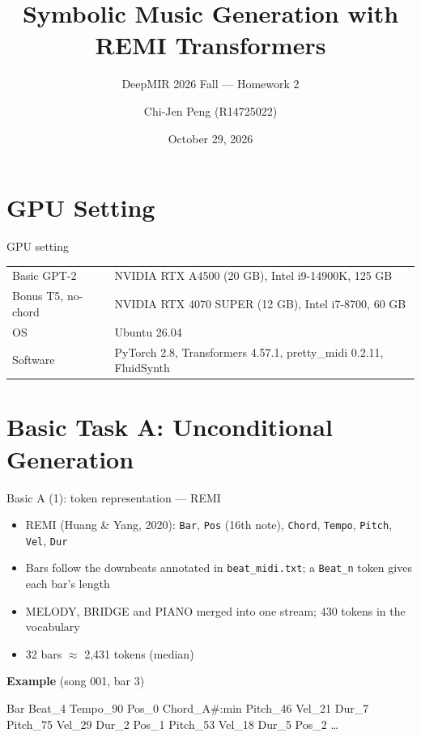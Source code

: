 \documentclass[aspectratio=169,11pt]{beamer}
\title{Symbolic Music Generation with REMI Transformers}
\subtitle{DeepMIR 2026 Fall --- Homework 2}
\author{Chi-Jen Peng \quad (R14725022)}
\institute{Code, README: \url{https://github.com/chijenpeng/26-fall-DeepMIR-HW2}\\[0.3em]
Checkpoints, generated results: \url{https://github.com/chijenpeng/26-fall-DeepMIR-HW2/releases/tag/submission-v1}}
\date{October 29, 2026}
\newenvironment{tight}{\begin{itemize}\setlength{\itemsep}{1.5pt}\setlength{\parskip}{0pt}\setlength{\topsep}{0pt}}{\end{itemize}}
\begin{document}
\maketitle

\section{GPU Setting}
\begin{frame}{GPU setting}
  \centering
  \begin{tabular}{@{}ll@{}}
    \toprule
    Basic GPT-2 & NVIDIA RTX A4500 (20 GB), Intel i9-14900K, 125 GB \\
    Bonus T5, no-chord & NVIDIA RTX 4070 SUPER (12 GB), Intel i7-8700, 60 GB \\
    OS & Ubuntu 26.04 \\
    Software & PyTorch 2.8, Transformers 4.57.1, pretty\_midi 0.2.11, FluidSynth \\
    \bottomrule
  \end{tabular}
\end{frame}

\section{Basic Task A: Unconditional Generation}

\begin{frame}[t]{Basic A (1): token representation --- REMI}
  \begin{tight}
    \item REMI (Huang \& Yang, 2020): \texttt{Bar}, \texttt{Pos} (16th note), \texttt{Chord}, \texttt{Tempo}, \texttt{Pitch}, \texttt{Vel}, \texttt{Dur}
    \item Bars follow the downbeats annotated in \texttt{beat\_midi.txt}; a \texttt{Beat\_n} token gives each bar's length
    \item MELODY, BRIDGE and PIANO merged into one stream; 430 tokens in the vocabulary
    \item 32 bars $\approx$ 2{,}431 tokens (median)
  \end{tight}
  \vspace{1em}
  \textbf{Example} (song 001, bar 3)\\[0.3em]
  {\footnotesize\ttfamily Bar Beat\_4 Tempo\_90 Pos\_0 Chord\_A\#:min Pitch\_46 Vel\_21 Dur\_7
  Pitch\_75 Vel\_29 Dur\_2 Pos\_1 Pitch\_53 Vel\_18 Dur\_5 Pos\_2 \dots\par}
\end{frame}
\end{document}
